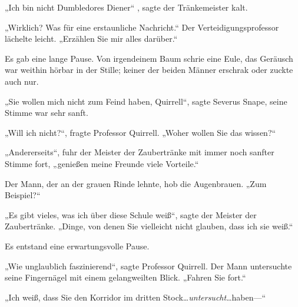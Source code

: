 „Ich bin nicht Dumbledores Diener“ , sagte der Tränkemeister kalt.

„Wirklich? Was für eine erstaunliche Nachricht.“ Der Verteidigungsprofessor lächelte leicht. „Erzählen Sie mir alles darüber.“

Es gab eine lange Pause. Von irgendeinem Baum schrie eine Eule, das Geräusch war weithin hörbar in der Stille; keiner der beiden Männer erschrak oder zuckte auch nur.

„Sie wollen mich nicht zum Feind haben, Quirrell“, sagte Severus Snape, seine Stimme war sehr sanft.

„Will ich nicht?“, fragte Professor Quirrell. „Woher wollen Sie das wissen?“

„Andererseits“, fuhr der Meister der Zaubertränke mit immer noch sanfter Stimme fort, „genießen meine Freunde viele Vorteile.“

Der Mann, der an der grauen Rinde lehnte, hob die Augenbrauen. „Zum Beispiel?“

„Es gibt vieles, was ich über diese Schule weiß“, sagte der Meister der Zaubertränke. „Dinge, von denen Sie vielleicht nicht glauben, dass ich sie weiß.“

Es entstand eine erwartungsvolle Pause.

„Wie unglaublich faszinierend“, sagte Professor Quirrell. Der Mann untersuchte seine Fingernägel mit einem gelangweilten Blick. „Fahren Sie fort.“

„Ich weiß, dass Sie den Korridor im dritten Stock…\emph{untersucht}…haben—“

